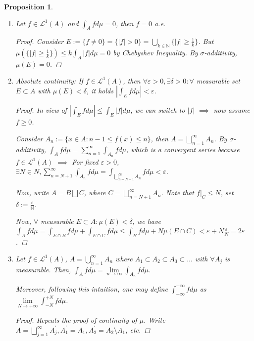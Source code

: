 \documentclass[12pt]{article}
\theoremstyle{blueplain}
\newtheorem{proposition}[theorem]{Proposition}
\theoremstyle{bluedef}
\theoremstyle{blueremark}
\newcommand{\N}{\mathbb{N}}
\newcommand{\eps}{\varepsilon}
\numberwithin{equation}{section}
\begin{document}
\begin{proposition}
\begin{enumerate}
    \item Let $f \in \mathcal{L}^1(A)$ and $\int_A f d\mu = 0$, then $f = 0$ a.e.
          \begin{proof}
            Consider $E := \{f \neq 0\} = \{|f| > 0\} = \bigcup_{k \in \N} \{|f| \geq \frac{1}{k}\}$. But $\mu(\{|f| \geq \frac{1}{k}\}) \leq k \int_A |f| d\mu = 0$ by Chebyshev Inequality. By $\sigma$-additivity, $\mu(E) = 0$.
          \end{proof}
    \item Absolute continuity: If $f \in \mathcal{L}^1(A)$, then $\forall \eps > 0, \exists \delta > 0: \forall$ measurable set $E \subset A$ with $\mu(E) < \delta$, it holds $|\int_E f d\mu| < \eps$.
          \begin{proof}
            In view of $|\int_E f d\mu| \leq \int_E |f| d\mu$, we can switch to $|f|$ $\implies$ now assume $f \geq 0$.

            Consider $A_n := \{x \in A: n-1 \leq f(x) \leq n\}$, then $A = \bigsqcup_{n=1}^{\infty} A_n$. By $\sigma$-additivity, $\int_A f d\mu = \sum_{n=1}^{\infty} \int_{A_n} f d\mu$, which is a convergent series because $f \in \mathcal{L}^1(A)$ $\implies$ For fixed $\eps > 0$, $\exists N \in N, \sum_{n=N+1}^{\infty} \int_{A_n} f d\mu = \int_{\bigsqcup_{n=N+1}^{\infty} A_n} f d\mu < \eps$.

            Now, write $A = B \bigsqcup C$, where $C = \bigsqcup_{n=N+1}^{\infty} A_n$. Note that $f|_C \leq N$, set $\delta := \frac{\eps}{\N}$.

            Now, $\forall$ measurable $E \subset A: \mu(E) < \delta$, we have $\int_A f d\mu = \int_{E \cap B} f d\mu + \int_{E \cap C} f d\mu \leq \int_B f d\mu + N \mu(E \cap C) < \eps + N \frac{\eps}{N} = 2\eps$.
          \end{proof}
    \item Let $f \in \mathcal{L}^1(A)$, $A = \bigcup_{n=1}^{\infty} A_n$ where $A_1 \subset A_2 \subset A_3 \subset \ldots$ with $\forall A_j$ is measurable. Then, $\int_A f d\mu = \lim\limits_{n \to \infty} \int_{A_n} f d\mu$.

          Moreover, following this intuition, one may define $\int_{-\infty}^{+\infty} f d\mu$ as $\lim\limits_{N \to +\infty} \int_{-N}^{+N} f d\mu$.

          \begin{proof}
            Repeats the proof of continuity of $\mu$. Write $A = \bigsqcup_{j=1}^{\infty} A_j^\prime, A_1^\prime = A_1, A_2^\prime = A_2 \setminus A_1$, etc.


\end{proof}
\end{enumerate}
\end{proposition}
\end{document}
